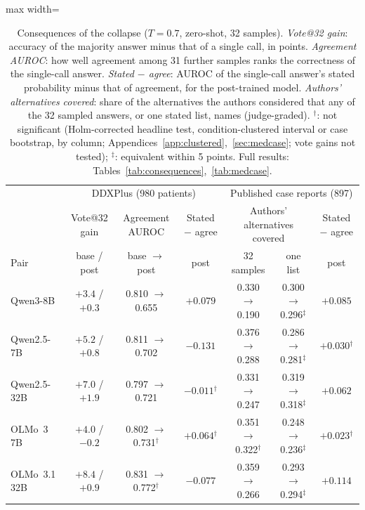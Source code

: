 \documentclass[wcp]{jmlr}
\begin{document}
\begin{table}[t]
\centering\small
\setlength{\tabcolsep}{3.5pt}
\begin{adjustbox}{max width=\linewidth}
\begin{tabular}{lcccccc}
\toprule
 & \multicolumn{3}{c}{DDXPlus (980 patients)} & \multicolumn{3}{c}{Published case reports (897)} \\
 & Vote@32 gain & Agreement AUROC & Stated $-$ agree & \multicolumn{2}{c}{Authors' alternatives covered} & Stated $-$ agree \\
Pair & base / post & base $\rightarrow$ post & post & 32 samples & one list & post \\
\midrule
Qwen3-8B & $+3.4$ / $+0.3$ & 0.810 $\rightarrow$ 0.655 & $+0.079$ & 0.330 $\rightarrow$ 0.190 & 0.300 $\rightarrow$ 0.296$^{\ddagger}$ & $+0.085$ \\
Qwen2.5-7B & $+5.2$ / $+0.8$ & 0.811 $\rightarrow$ 0.702 & $-0.131$ & 0.376 $\rightarrow$ 0.288 & 0.286 $\rightarrow$ 0.281$^{\ddagger}$ & $+0.030$$^{\dagger}$ \\
Qwen2.5-32B & $+7.0$ / $+1.9$ & 0.797 $\rightarrow$ 0.721 & $-0.011$$^{\dagger}$ & 0.331 $\rightarrow$ 0.247 & 0.319 $\rightarrow$ 0.318$^{\ddagger}$ & $+0.062$ \\
OLMo~3 7B & $+4.0$ / $-0.2$ & 0.802 $\rightarrow$ 0.731$^{\dagger}$ & $+0.064$$^{\dagger}$ & 0.351 $\rightarrow$ 0.322$^{\dagger}$ & 0.248 $\rightarrow$ 0.236$^{\ddagger}$ & $+0.023$$^{\dagger}$ \\
OLMo~3.1 32B & $+8.4$ / $+0.9$ & 0.831 $\rightarrow$ 0.772$^{\dagger}$ & $-0.077$ & 0.359 $\rightarrow$ 0.266 & 0.293 $\rightarrow$ 0.294$^{\ddagger}$ & $+0.114$ \\
\bottomrule
\end{tabular}
\end{adjustbox}
\caption{Consequences of the collapse ($T{=}0.7$, zero-shot, 32 samples). \emph{Vote@32 gain}: accuracy of the majority answer minus that of a single call, in points. \emph{Agreement AUROC}: how well agreement among 31 further samples ranks the correctness of the single-call answer. \emph{Stated $-$ agree}: AUROC of the single-call answer's stated probability minus that of agreement, for the post-trained model. \emph{Authors' alternatives covered}: share of the alternatives the authors considered that any of the 32 sampled answers, or one stated list, names (judge-graded). $^{\dagger}$: not significant (Holm-corrected headline test, condition-clustered interval or case bootstrap, by column; Appendices~\ref{app:clustered},~\ref{sec:medcase}; vote gains not tested); $^{\ddagger}$: equivalent within 5 points. Full results: Tables~\ref{tab:consequences},~\ref{tab:medcase}.}
\label{tab:conseq}
\end{table}
\end{document}
